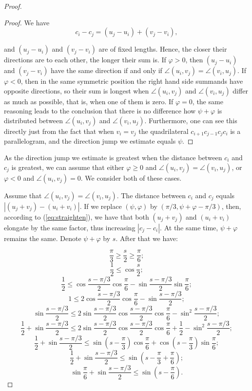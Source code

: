\begin{enumerate}[label={\bf Case \arabic*: }, wide, labelwidth=!, labelindent=0pt]
\begin{proof}
\begin{proof}
We have
$$c_i - c_j = (u_j - u_i) + (v_j - v_i),$$

and $(u_j - u_i)$ and $(v_j - v_i)$ are of fixed lengths. Hence, the closer their directions are to each other, the longer their sum is. If $\varphi > 0$, then $(u_j - u_i)$ and $(v_j - v_i)$ have the same direction if and only if $\angle(u_i, v_j) = \angle(v_i, u_j)$. If $\varphi < 0$, then in the same symmetric position the right hand side summands have opposite directions, so their sum is longest when $\angle(u_i, v_j)$ and $\angle(v_i, u_j)$ differ as much as possible, that is, when one of them is zero. If $\varphi = 0$, the same reasoning leads to the conclusion that there is no difference how $\psi + \varphi$ is distributed between $\angle(u_i, v_j)$ and $\angle(v_i, u_j)$. Furthermore, one can see this directly just from the fact that when $v_i = v_j$ the quadrilateral $c_{i+1}c_{j-1}c_jc_i$ is a parallelogram, and the direction jump we estimate equals $\psi$.
\end{proof}

As the direction jump we estimate is greatest when the distance between $c_i$ and $c_j$ is greatest, we can assume that either $\varphi\geq 0$ and $\angle(u_i, v_j) = \angle(v_i, u_j)$, or $\varphi < 0$ and $\angle(u_i, v_j) = 0$. We consider both of these cases.

Assume that $\angle(u_i, v_j) = \angle(v_i, u_j)$. The distance between $c_i$ and $c_j$ equals $|(u_j + v_j) - (u_i + v_i)|$. If we replace $(\psi, \varphi)$ by $(\pi/3, \psi + \varphi - \pi/3)$, then, according to (\ref{eq:straighten}), we have that both $(u_j + v_j)$ and $(u_i + v_i)$ elongate by the same factor, thus increasing $|c_j - c_i|$. At the same time, $\psi + \varphi$ remains the same. Denote $\psi + \varphi$ by $s$. After that we have:

$$\frac{\pi}{3} \geq \frac{s}{2} \geq\frac{\pi}{6};$$
$$\frac12 \leq \cos\frac{s}{2};$$
$$\frac12 \leq \cos\frac{s - \pi/3}{2}\cos\frac{\pi}{6} - \sin\frac{s - \pi/3}{2}\sin\frac{\pi}{6};$$
$$1 \leq 2\cos\frac{s - \pi/3}{2}\cos\frac{\pi}{6} - \sin\frac{s - \pi/3}{2};$$
$$\sin\frac{s - \pi/3}{2} \leq 2\sin\frac{s - \pi/3}{2}\cos\frac{s - \pi/3}{2}\cos\frac{\pi}{6} - \sin^2\frac{s - \pi/3}{2};$$
$$\frac12 + \sin\frac{s - \pi/3}{2} \leq 2\sin\frac{s - \pi/3}{2}\cos\frac{s - \pi/3}{2}\cos\frac{\pi}{6} + \frac12 - \sin^2\frac{s - \pi/3}{2};$$
$$\frac12 + \sin\frac{s - \pi/3}{2} \leq \sin\left(s - \frac{\pi}{3}\right)\cos\frac{\pi}{6} + \cos\left(s - \frac{\pi}{3}\right)\sin\frac{\pi}{6};$$
$$\frac12 + \sin\frac{s - \pi/3}{2} \leq \sin\left(s - \frac{\pi}{3} + \frac{\pi}{6}\right);$$
$$\sin\frac{\pi}{6} + \sin\frac{s - \pi/3}{2} \leq \sin\left(s - \frac{\pi}{6}\right).$$


\end{proof}
\end{enumerate}
